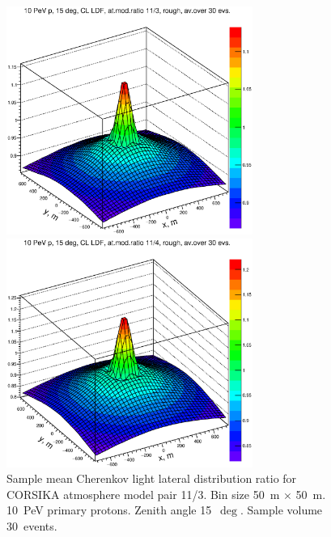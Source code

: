 \documentclass[final,5p,times,twocolumn]{elsarticle}
\begin{document}
\begin{figure}[tb]
 \begin{minipage}[t]{0.48\textwidth}
    \centering
    \includegraphics[width=19pc]{figs/11d3.eps}%
    \vspace{-1.0pc}
    \caption{Sample mean Cherenkov light lateral distribution ratio for CORSIKA atmosphere model
    pair 11/3. Bin size 50~m $\times$ 50~m. 10~PeV primary protons. Zenith angle 15~$\deg$. Sample volume 30~events.}
\label{fig:3d11}
\end{minipage}
\hfill
\begin{minipage}[t]{0.48\textwidth}
    \centering
    \includegraphics[width=19pc]{figs/11d4.eps}%

\end{minipage}
\end{figure}
\end{document}
